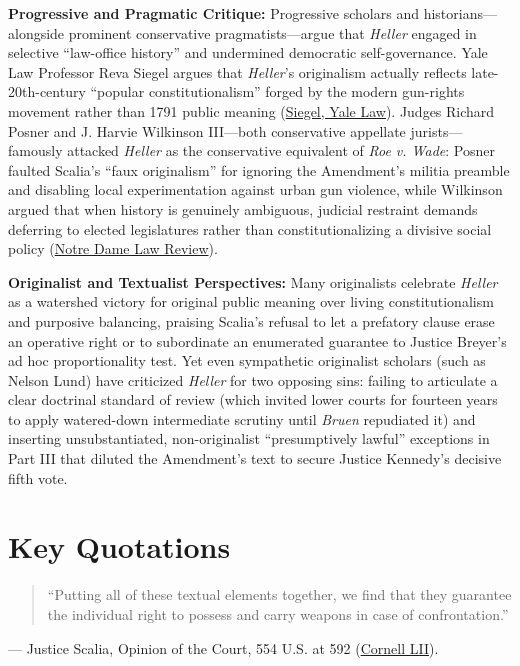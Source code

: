 \documentclass[12pt]{article}
\begin{document}
\textbf{Progressive and Pragmatic Critique:} Progressive scholars and historians---alongside prominent conservative pragmatists---argue that \textit{Heller} engaged in selective ``law-office history'' and undermined democratic self-governance. Yale Law Professor Reva Siegel argues that \textit{Heller}'s originalism actually reflects late-20th-century ``popular constitutionalism'' forged by the modern gun-rights movement rather than 1791 public meaning (\href{https://law.yale.edu/sites/default/files/documents/pdf/Faculty/Siegel_DeadOrAliveOriginalismAsPopularConstitutionalismInHeller.pdf}{Siegel, Yale Law}). Judges Richard Posner and J. Harvie Wilkinson III---both conservative appellate jurists---famously attacked \textit{Heller} as the conservative equivalent of \textit{Roe v. Wade}: Posner faulted Scalia's ``faux originalism'' for ignoring the Amendment's militia preamble and disabling local experimentation against urban gun violence, while Wilkinson argued that when history is genuinely ambiguous, judicial restraint demands deferring to elected legislatures rather than constitutionalizing a divisive social policy (\href{https://scholarship.law.nd.edu/cgi/viewcontent.cgi?article=4582&context=ndlr}{Notre Dame Law Review}).

\textbf{Originalist and Textualist Perspectives:} Many originalists celebrate \textit{Heller} as a watershed victory for original public meaning over living constitutionalism and purposive balancing, praising Scalia's refusal to let a prefatory clause erase an operative right or to subordinate an enumerated guarantee to Justice Breyer's ad hoc proportionality test. Yet even sympathetic originalist scholars (such as Nelson Lund) have criticized \textit{Heller} for two opposing sins: failing to articulate a clear doctrinal standard of review (which invited lower courts for fourteen years to apply watered-down intermediate scrutiny until \textit{Bruen} repudiated it) and inserting unsubstantiated, non-originalist ``presumptively lawful'' exceptions in Part III that diluted the Amendment's text to secure Justice Kennedy's decisive fifth vote.

\section{Key Quotations}
\begin{quote}
``Putting all of these textual elements together, we find that they guarantee the individual right to possess and carry weapons in case of confrontation.''
\end{quote}
\noindent --- Justice Scalia, Opinion of the Court, 554 U.S. at 592 (\href{https://www.law.cornell.edu/supct/html/07-290.ZO.html}{Cornell LII}).
\end{document}
